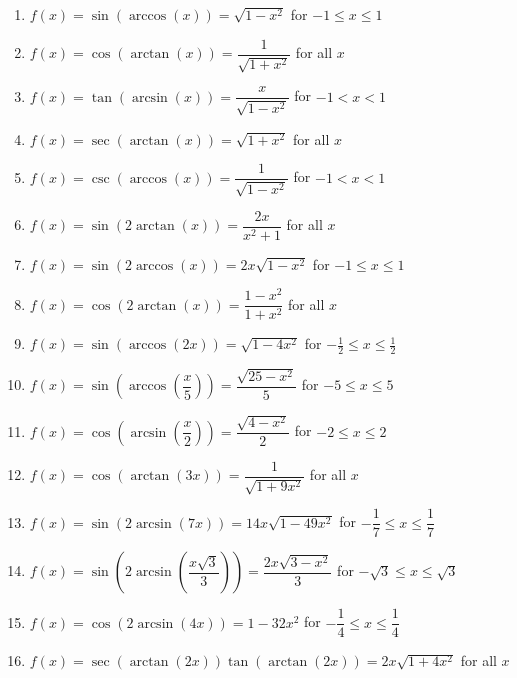 \documentclass{ximera}
\begin{document}
\begin{enumerate}

\setcounter{enumi}{\value{HW}}

\item $f(x) = \sin \left( \arccos \left( x \right) \right) = \sqrt{1 - x^{2}}$  for $-1 \leq x \leq 1$
\item $f(x) = \cos \left( \arctan \left( x \right) \right) = \dfrac{1}{\sqrt{1 + x^{2}}}$ for all $x$
\item $f(x) =\tan \left( \arcsin \left( x \right) \right) = \dfrac{x}{\sqrt{1 - x^{2}}}$  for $-1 < x < 1$
\item $f(x) =\sec \left( \arctan \left( x \right) \right) = \sqrt{1 + x^{2}}$ for all $x$
\item $f(x) =\csc \left( \arccos \left( x \right) \right) = \dfrac{1}{\sqrt{1 - x^{2}}}$ for $-1 < x < 1$
\item $f(x) =\sin \left( 2\arctan \left( x \right) \right) = \dfrac{2x}{x^{2} + 1}$ for all $x$
\item $f(x) =\sin \left( 2\arccos \left( x \right) \right) = 2x\sqrt{1-x^2}$  for $-1 \leq x \leq 1$
\item $f(x) =\cos \left( 2\arctan \left( x \right) \right) = \dfrac{1 - x^{2}}{1 + x^{2}}$ for all $x$
\item  $f(x) =\sin(\arccos(2x)) = \sqrt{1-4x^2}$ for $-\frac{1}{2} \leq x \leq \frac{1}{2}$
\item  $f(x) =\sin\left(\arccos\left(\dfrac{x}{5}\right)\right) = \dfrac{\sqrt{25-x^2}}{5}$ for $-5 \leq x \leq 5$
\item  $f(x) =\cos\left(\arcsin\left(\dfrac{x}{2}\right)\right) = \dfrac{\sqrt{4-x^2}}{2}$ for $-2 \leq x \leq 2$
\item  $f(x) =\cos\left(\arctan\left(3x\right)\right) = \dfrac{1}{\sqrt{1+9x^{2}}}$ for all $x$
\item  $f(x) =\sin(2\arcsin(7x)) = 14x \sqrt{1-49x^2}$ for $-\dfrac{1}{7} \leq x \leq \dfrac{1}{7}$
\item  $f(x) =\sin\left(2 \arcsin\left( \dfrac{x\sqrt{3}}{3} \right) \right) = \dfrac{2x\sqrt{3-x^2}}{3}$ for $-\sqrt{3} \leq x \leq \sqrt{3}$
\item  $f(x) =\cos(2 \arcsin(4x)) = 1 - 32x^2$ for $-\dfrac{1}{4} \leq x \leq \dfrac{1}{4}$
\item  $f(x) =\sec(\arctan(2x))\tan(\arctan(2x)) = 2x \sqrt{1+4x^2}$ for all $x$



\end{enumerate}
\end{document}
